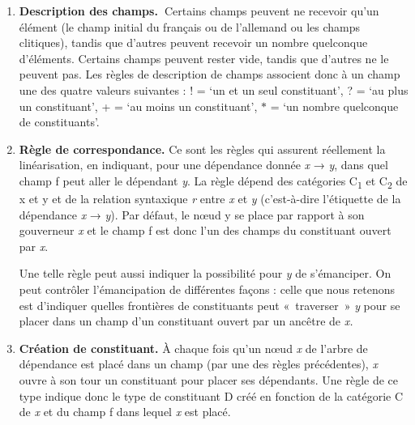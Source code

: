 {\begin{enumerate}
    La principale différence avec les règles de réécriture est qu’un constituant n’est pas réécrit en une liste de constituants, mais en une liste de champs, auxquels sont assignés des constituants par d’autres règles.

    \item \textbf{Description des champs.~}Certains champs peuvent ne recevoir qu’un élément (le champ initial du français ou de l’allemand ou les champs clitiques), tandis que d’autres peuvent recevoir un nombre quelconque d’éléments. Certains champs peuvent rester vide, tandis que d’autres ne le peuvent pas. Les règles de description de champs associent donc à un champ une des quatre valeurs suivantes : ! = ‘un et un seul constituant’, ? = ‘au plus un constituant’, + = ‘au moins un constituant’, \textrm{$*$} = ‘un nombre quelconque de constituants’.

    \item \textbf{Règle de correspondance.} Ce sont les règles qui assurent réellement la linéarisation, en indiquant, pour une dépendance donnée \textit{x} \textrm{→} \textit{y}, dans quel champ f peut aller le dépendant \textit{y}. La règle dépend des catégories C\textsubscript{1} et C\textsubscript{2} de x et y et de la relation syntaxique \textit{r} entre \textit{x} et \textit{y} (c’est-à-dire l’étiquette de la dépendance \textit{x} \textrm{→} \textit{y}). Par défaut, le nœud y se place par rapport à son gouverneur \textit{x} et le champ f est donc l’un des champs du constituant ouvert par \textit{x}.

    \ea

    \z

    Une telle règle peut aussi indiquer la possibilité pour \textit{y} de s’émanciper. On peut contrôler l’émancipation de différentes façons : celle que nous retenons est d’indiquer quelles frontières de constituants peut «~traverser~» \textit{y} pour se placer dans un champ d’un constituant ouvert par un ancêtre de \textit{x.}

    \item \textbf{Création de constituant.} À chaque fois qu’un nœud \textit{x} de l’arbre de dépendance est placé dans un champ (par une des règles précédentes), \textit{x} ouvre à son tour un constituant pour placer ses dépendants. Une règle de ce type indique donc le type de constituant D créé en fonction de la catégorie C de \textit{x} et du champ f dans lequel \textit{x} est placé.


\end{enumerate}}
